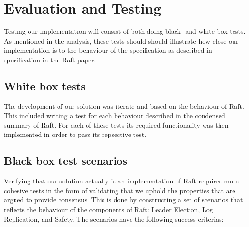 \section{Evaluation and Testing} %
\label{sec:evaluation_and_testing}
Testing our implementation will consist of both doing black- and white box tests. As mentioned in the analysis, these tests should should illustrate how close our implementation is to the behaviour of the specification as described in specification in the Raft\cite{Raft} paper.


\subsection{White box tests}
The development of our solution was iterate and based on the behaviour of Raft. This included writing a test for each behaviour described in the condensed summary of Raft\cite{Raft}. For each of these tests its required functionality was then implemented in order to pass its repsective test. 


\subsection{Black box test scenarios}
Verifying that our solution actually is an implementation of Raft requires more cohesive tests in the form of validating that we uphold the properties that are argued to provide consensus. This is done by constructing a set of scenarios that reflects the behaviour of the components of Raft: Leader Election, Log Replication, and Safety. The scenarios have the following success criterias:

